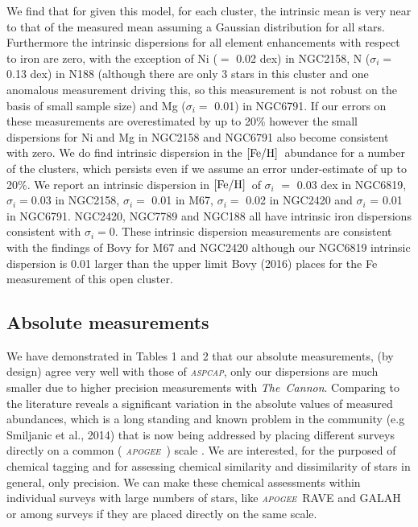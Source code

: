 \documentclass[14pt, preprint2]{aastex6}
\newcommand{\project}[1]{\textsl{#1}}
\newcommand{\tc}{\project{The~Cannon}}
\newcommand{\apogee}{\project{\textsc{apogee}}}
\newcommand{\aspcap}{\project{\textsc{aspcap}}}
\newcommand{\feh}{\mbox{$\rm [Fe/H]$}}
\begin{document}
We find that for given this model, for each cluster, the intrinsic mean is very near to that of the measured mean assuming a Gaussian distribution for all stars. Furthermore the intrinsic dispersions for all element enhancements with respect to iron are zero, with the exception of Ni ($=$ 0.02 dex) in NGC2158, N ($\sigma_i$$=$ 0.13 dex) in N188 (although there are only 3 stars in this cluster and one anomalous measurement driving this, so this measurement is not robust on the basis of small sample size) and Mg ($\sigma_i$$=$ 0.01) in NGC6791. If our errors on these measurements are overestimated by up to 20\% however the small dispersions for Ni and Mg in NGC2158 and NGC6791 also become consistent with zero. We do find intrinsic dispersion in the \feh\ abundance for a number of the clusters, which persists even if we assume an error under-estimate of up to 20\%. We report an intrinsic dispersion in \feh\ of $\sigma_i$ $=$ 0.03 dex in NGC6819, $\sigma_i$$=$0.03 in NGC2158, $\sigma_i$$=$ 0.01 in M67,  $\sigma_i$$=$ 0.02 in NGC2420 and $\sigma_i$ = 0.01 in NGC6791. NGC2420, NGC7789 and NGC188 all have intrinsic iron dispersions consistent with  $\sigma_i$$=$0. These intrinsic dispersion measurements are consistent with the findings of Bovy for M67 and NGC2420 although our NGC6819 intrinsic dispersion is 0.01 larger than the upper limit Bovy (2016) places for the Fe measurement of this open cluster. 


\subsection{Absolute measurements}

We have demonstrated in Tables 1 and 2 that our absolute measurements, (by design) agree very well with those of \aspcap, only our dispersions are much smaller due to higher precision measurements with \tc. Comparing to the literature reveals a significant variation in the absolute values of measured abundances, which is a long standing and known problem in the community  (e.g Smiljanic et al., 2014) that is now being addressed by placing different surveys directly on a common ( \apogee\ ) scale \citep[e.g.][]{Ho2016,Casey2016}. We are interested, for the purposed of chemical tagging and for assessing chemical similarity and dissimilarity of stars in general, only precision. We can make these chemical assessments within individual surveys with large numbers of stars, like \apogee\, RAVE and GALAH or among surveys if they are placed directly on the same scale. 
\end{document}
